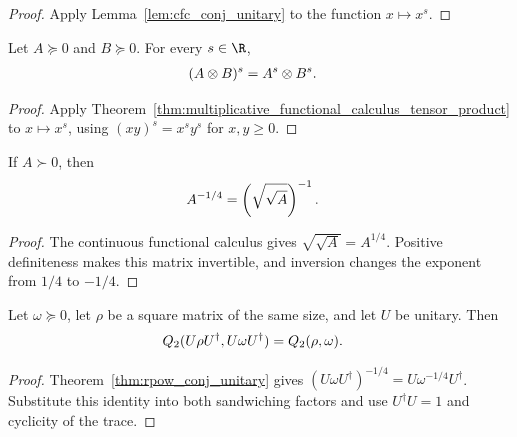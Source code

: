 \begin{proof}\leanok
    Apply Lemma~\ref{lem:cfc_conj_unitary} to the function $x\mapsto x^s$.
\end{proof}

\begin{theorem}
    \label{thm:rpow_kronecker_possemidef}
    \leanok
    Let $A\succeq0$ and $B\succeq0$. For every $s\in\R$,
    \begin{align}
        (A\otimes B)^s & =A^s\otimes B^s.
        \notag
    \end{align}
\end{theorem}

\begin{proof}\leanok
    Apply
    Theorem~\ref{thm:multiplicative_functional_calculus_tensor_product} to
    $x\mapsto x^s$, using $(xy)^s=x^sy^s$ for $x,y\geq0$.
\end{proof}

\begin{theorem}
    \label{thm:rpow_neg_quarter_inv_sqrt_sqrt}
    \leanok
    If $A\succ0$, then
    \begin{align}
        A^{-1/4} & =\left(\sqrt{\sqrt A}\right)^{-1}.
        \notag
    \end{align}
\end{theorem}

\begin{proof}\leanok
    The continuous functional calculus gives
    $\sqrt{\sqrt A}=A^{1/4}$. Positive definiteness makes this matrix
    invertible, and inversion changes the exponent from $1/4$ to $-1/4$.
\end{proof}

\begin{theorem}
    \label{thm:sandwiched_renyi_two_unitary_invariance}
    \leanok
    Let $\omega\succeq0$, let $\rho$ be a square matrix of the same size, and
    let $U$ be unitary. Then
    \begin{align}
        Q_2(U\rho U^\dagger,U\omega U^\dagger)
         & =Q_2(\rho,\omega).
        \notag
    \end{align}
\end{theorem}

\begin{proof}\leanok
    Theorem~\ref{thm:rpow_conj_unitary} gives
    $(U\omega U^\dagger)^{-1/4}=U\omega^{-1/4}U^\dagger$.
    Substitute this identity into both sandwiching factors and use
    $U^\dagger U=1$ and cyclicity of the trace.
\end{proof}

